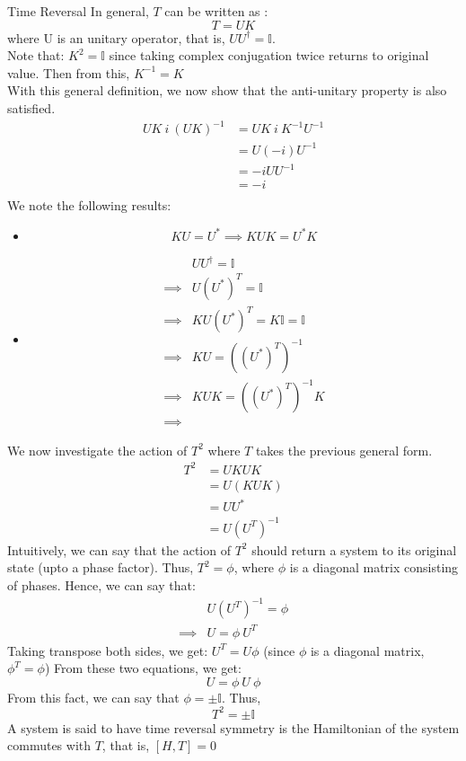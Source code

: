 \documentclass[12pt, oneside, listof=totoc,dvipsnames]{scrbook}
\begin{document}
\begin{chapter}{Time Reversal}
		In general, $T$ can be written as :$$T=UK$$ where U is an unitary operator, that is, $U U^\dagger = \mathbb{I}$.\\[0.2cm]
		Note that: $K^2=\mathbb{I}$ since taking complex conjugation twice returns to original value. Then from this, $K^{-1}=K$\\[0.2cm]
		\noindent
		With this general definition, we now show that the anti-unitary property is also satisfied.
		\begin{align*}
			UK \ i \ (UK)^{-1} &= U K \ i \ K^{-1} U^{-1}\\
			&=  U (-i) U^{-1}\\
			&=-i U  U^{-1}\\
			&= -i \\
		\end{align*}
		We note the following results:
		\begin{itemize}
			\item $$KU=U^* \implies KUK= U^*K$$
			\item 
			\begin{align*}
				& U U^\dagger = \mathbb{I}\\ \implies
				& U (U^*)^T =  \mathbb{I}\\\implies
				& KU (U^*)^T = K \mathbb{I} =\mathbb{I}\\\implies
				& KU =  ((U^*)^T) ^{-1}\\\implies
				&KUK =  ((U^*)^T) ^{-1}K\\\implies
			\end{align*}
		\end{itemize}
		
		
		
		We now investigate the action of $T^2$ where $T$ takes the previous general form.
		\begin{align*} 
			T^2 &= UKUK\\
			&= U (KUK)\\
			&= U U^*\\
			&= U (U^T)^{-1}
		\end{align*}
		Intuitively, we can say that the action of $T^2$ should return a system to its original state (upto a phase factor). 
		Thus, $T^2= \phi $, where $\phi$ is a diagonal matrix consisting of phases. 
		\noindent
		Hence, we can say that: 
		\begin{align*}
			&U (U^T)^{-1}=\phi \\
			\implies &U= \phi \ U^T
		\end{align*}
		Taking transpose both sides, we get:
		$U^T=U\phi $ (since $\phi$ is a diagonal matrix, $\phi^T=\phi$)
		From these two equations, we get:
		$$U=\phi \ U \ \phi$$
		From this fact, we can say that $\phi = \pm
		\mathbb{I}$. Thus, 
		$$\boxed{T^2= \pm \mathbb{I}}$$
		A system is said to have time reversal symmetry is the Hamiltonian of the system commutes with $T$, that is, $[H,T]=0$
		

\end{chapter}
\end{document}

